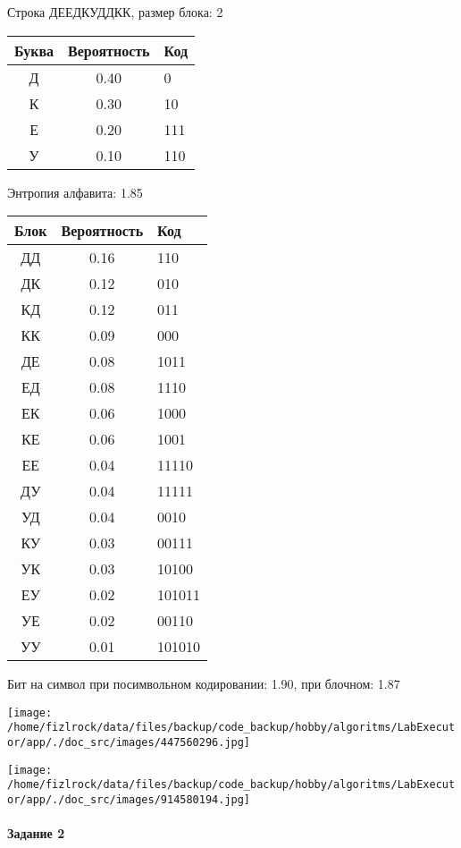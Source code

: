 \documentclass[a4paper, 12pt]{article}
\begin{document}
Строка ДЕЕДКУДДКК, размер блока: 2
\begin{center}
 \begin{tabular}{ |c|c|l| } 
  \hline
     Буква & Вероятность & Код\\ \hline
Д & 0.40 & 0\\\hline
К & 0.30 & 10\\\hline
Е & 0.20 & 111\\\hline
У & 0.10 & 110
\\ \hline \end{tabular}
\end{center}
Энтропия алфавита: 1.85
\begin{center}
 \begin{tabular}{ |c|c|l| } 
  \hline
     Блок & Вероятность & Код\\ \hline
ДД & 0.16 & 110\\\hline
ДК & 0.12 & 010\\\hline
КД & 0.12 & 011\\\hline
КК & 0.09 & 000\\\hline
ДЕ & 0.08 & 1011\\\hline
ЕД & 0.08 & 1110\\\hline
ЕК & 0.06 & 1000\\\hline
КЕ & 0.06 & 1001\\\hline
ЕЕ & 0.04 & 11110\\\hline
ДУ & 0.04 & 11111\\\hline
УД & 0.04 & 0010\\\hline
КУ & 0.03 & 00111\\\hline
УК & 0.03 & 10100\\\hline
ЕУ & 0.02 & 101011\\\hline
УЕ & 0.02 & 00110\\\hline
УУ & 0.01 & 101010
\\ \hline \end{tabular}
\end{center}
Бит на символ при посимвольном кодировании: 1.90, при блочном: 1.87

\texttt{[image: /home/fizlrock/data/files/backup/code\_backup/hobby/algoritms/LabExecutor/app/./doc\_src/images/447560296.jpg]}

\texttt{[image: /home/fizlrock/data/files/backup/code\_backup/hobby/algoritms/LabExecutor/app/./doc\_src/images/914580194.jpg]}
\pagebreak
\paragraph{Задание 2}
\end{document}
